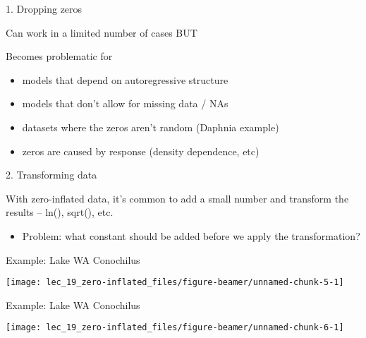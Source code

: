 \documentclass[ignorenonframetext,]{beamer}
\providecommand{\tightlist}{%
  \setlength{\itemsep}{0pt}\setlength{\parskip}{0pt}}
\begin{document}
\begin{frame}{1. Dropping zeros}
\protect\hypertarget{dropping-zeros-2}{}

Can work in a limited number of cases BUT

Becomes problematic for

\begin{itemize}
\item
  models that depend on autoregressive structure
\item
  models that don't allow for missing data / NAs
\item
  datasets where the zeros aren't random (Daphnia example)
\item
  zeros are caused by response (density dependence, etc)
\end{itemize}

\end{frame}

\begin{frame}{2. Transforming data}
\protect\hypertarget{transforming-data}{}

With zero-inflated data, it's common to add a small number and transform
the results -- ln(), sqrt(), etc.

\begin{itemize}
\tightlist
\item
  Problem: what constant should be added before we apply the
  transformation?
\end{itemize}

\end{frame}

\begin{frame}{Example: Lake WA Conochilus}
\protect\hypertarget{example-lake-wa-conochilus}{}

\begin{center}\texttt{[image: lec\_19\_zero-inflated\_files/figure-beamer/unnamed-chunk-5-1]} \end{center}

\end{frame}

\begin{frame}{Example: Lake WA Conochilus}
\protect\hypertarget{example-lake-wa-conochilus-1}{}

\begin{center}\texttt{[image: lec\_19\_zero-inflated\_files/figure-beamer/unnamed-chunk-6-1]} \end{center}

\end{frame}
\end{document}
